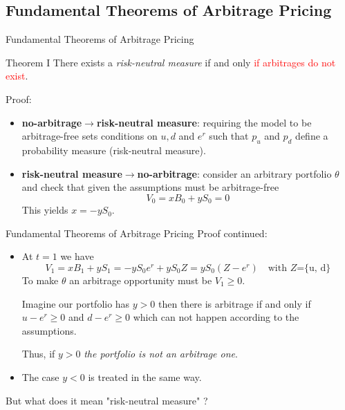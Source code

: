 \documentclass{beamer}
\begin{document}
\subsection{Fundamental Theorems of Arbitrage Pricing}
\begin{frame}{Fundamental Theorems of Arbitrage Pricing}
	\begin{block}{Theorem I}
		There exists a \emph{risk-neutral measure} if and only \textcolor{red}{if arbitrages do not exist}.
	\end{block}
	\pause
	Proof:
	\begin{itemize}
	\item \textbf{no-arbitrage$\rightarrow$risk-neutral measure}: requiring the model to be arbitrage-free sets conditions on $u, d$ and $e^r$ such that $p_u$ and $p_d$ define a probability measure (risk-neutral measure).
	\item \textbf{risk-neutral measure$\rightarrow$no-arbitrage}: consider an arbitrary portfolio $\theta$ and check that given the assumptions must be arbitrage-free
	\begin{equation*}
		V_0 = xB_0 + yS_0 = 0
	\end{equation*}
	This yields $x = -yS_0$.
	\end{itemize}
\end{frame}

\begin{frame}{Fundamental Theorems of Arbitrage Pricing}
	Proof continued:
	\begin{itemize}
		\item At $t=1$ we have 
		\begin{equation*}
			V_1 = xB_1 + yS_1 = -yS_0e^r + yS_0Z = yS_0(Z - e^r)\quad\text{with $Z$=\{u, d\}}
		\end{equation*}
		To make $\theta$ an arbitrage opportunity must be $V_1\geq 0$.

		Imagine our portfolio has $y > 0$ then there is arbitrage if and only if $u - e^r \geq 0$ and $d - e^r \geq 0$
		which can not happen according to the assumptions. 

		Thus, if $y > 0$ \emph{the portfolio is not an arbitrage one}. 
		\item The case $y < 0$ is treated in the same way. 
	\end{itemize}
	\pause
	\vspace{0.5cm}
	But what does it mean "risk-neutral measure" ?
\end{frame}
\end{document}
